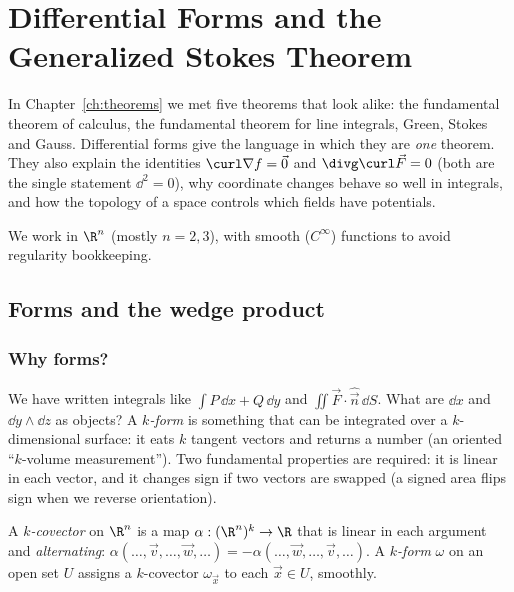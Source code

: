 \chapter{Differential Forms and the Generalized Stokes Theorem}
\label{ch:forms}

In Chapter~\ref{ch:theorems} we met five theorems that look alike: the fundamental theorem of calculus, the fundamental theorem for line integrals, Green, Stokes and Gauss. Differential forms give the language in which they are \emph{one} theorem. They also explain the identities $\curl\nabla f=\vec0$ and $\divg\curl\vec F=0$ (both are the single statement $\dd^2=0$), why coordinate changes behave so well in integrals, and how the topology of a space controls which fields have potentials.

We work in $\R^n$ (mostly $n=2,3$), with smooth ($C^\infty$) functions to avoid regularity bookkeeping.

\section{Forms and the wedge product}

\subsection{Why forms?}

We have written integrals like $\int P\,\dd x+Q\,\dd y$ and $\iint\vec F\cdot\hat{\vec n}\,\dd S$. What are $\dd x$ and $\dd y\wedge\dd z$ as objects? A \emph{$k$-form} is something that can be integrated over a $k$-dimensional surface: it eats $k$ tangent vectors and returns a number (an oriented ``$k$-volume measurement''). Two fundamental properties are required: it is linear in each vector, and it changes sign if two vectors are swapped (a signed area flips sign when we reverse orientation).

\begin{definition}
A \emph{$k$-covector} on $\R^n$ is a map $\alpha:(\R^n)^k\to\R$ that is linear in each argument and \emph{alternating}: $\alpha(\dots,\vec v,\dots,\vec w,\dots)=-\alpha(\dots,\vec w,\dots,\vec v,\dots)$. A \emph{$k$-form} $\omega$ on an open set $U$ assigns a $k$-covector $\omega_{\vec x}$ to each $\vec x\in U$, smoothly.
\end{definition}

